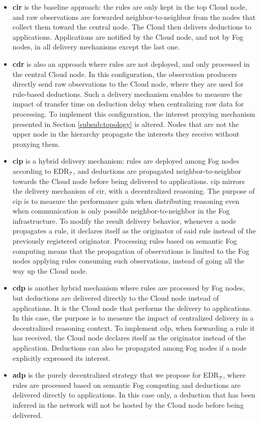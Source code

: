 \documentclass{iosart2c}
\newcommand{\edrt}{EDR$_{\mathcal{T}}$\xspace}
\begin{document}
\begin{itemize}
	\item \textbf{\gls{cir}} is the baseline approach: the rules are only kept in the top Cloud node, and raw observations are forwarded neighbor-to-neighbor from the nodes that collect them toward the central node. 
	The Cloud then delivers deductions to applications. 
	Applications are notified by the Cloud node, and not by Fog nodes, in all delivery mechanisms except the last one.
	
	\item \textbf{\gls{cdr}} is also an approach where rules are not deployed, and only processed in the central Cloud node. 
	In this configuration, the observation producers directly send raw observations to the Cloud node, where they are used for rule-based deductions.
	Such a delivery mechanism enables to measure the impact of transfer time on deduction delay when centralizing raw data for processing.
	To implement this configuration, the interest proxying mechanism presented in Section \textsection \ref{subsub:topology} is altered. 
	Nodes that are not the upper node in the hierarchy propagate the interests they receive without proxying them.
	
	\item \textbf{\gls{cip}} is a hybrid delivery mechanism: rules are deployed among Fog nodes according to \edrt, and deductions are propagated neighbor-to-neighbor towards the Cloud node before being delivered to applications. 
	\gls{cip} mirrors the delivery mechanism of \gls{cir}, with a decentralized reasoning.
	The purpose of \gls{cip} is to measure the performance gain when distributing reasoning even when communication is only possible neighbor-to-neighbor in the Fog infrastructure.
	To modify the result delivery behavior, whenever a node propagates a rule, it declares itself as the originator of said rule instead of the previously registered originator.
	Processing rules based on semantic Fog computing means that the propagation of observations is limited to the Fog nodes applying rules consuming such observations, instead of going all the way up the Cloud node.
	
	\item \textbf{\gls{cdp}} is another hybrid mechanism where rules are processed by Fog nodes, but deductions are delivered directly to the Cloud node instead of applications.
	It is the Cloud node that performs the delivery to applications.
	In this case, the purpose is to measure the impact of centralized delivery in a decentralized reasoning context.
	To implement \gls{cdp}, when forwarding a rule it has received, the Cloud node declares itself as the originator instead of the application.
	Deductions can also be propagated among Fog nodes if a node explicitly expressed its interest.
	
	\item \textbf{\gls{adp}} is the purely decentralized strategy that we propose for \edrt, where rules are processed based on semantic Fog computing and deductions are delivered directly to applications. 
	In this case only, a deduction that has been inferred in the network will not be hosted by the Cloud node before being delivered.
\end{itemize}
\end{document}
